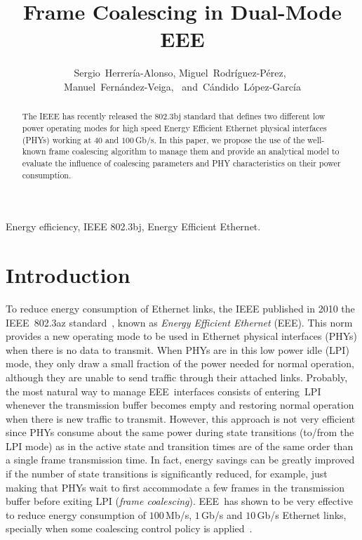 \documentclass[journal,10pt,letterpaper]{IEEEtran}
\begin{document}
\title{Frame Coalescing in Dual-Mode EEE}

\author{Sergio~Herrería-Alonso, 
  Miguel~Rodríguez-Pérez,~ \\
  Manuel~Fernández-Veiga,~ 
  and~Cándido~López-García}



\maketitle

\begin{abstract}
  The IEEE has recently released the 802.3bj standard that defines two
  different low power operating modes for high speed Energy Efficient
  Ethernet physical interfaces (PHYs) working at $40$ and
  $100\,$Gb/s. In this paper, we propose the use of the well-known
  frame coalescing algorithm to manage them and provide an analytical
  model to evaluate the influence of coalescing parameters and PHY
  characteristics on their power consumption.
\end{abstract}

\begin{IEEEkeywords}
  Energy efficiency, IEEE 802.3bj, Energy Efficient Ethernet.
\end{IEEEkeywords}

\section{Introduction}
\label{sec:intro}

To reduce energy consumption of Ethernet links, the IEEE published in
2010 the IEEE~802.3az standard~\cite{802.3az}, known as \emph{Energy
  Efficient Ethernet} (EEE). This norm provides a new operating mode
to be used in Ethernet physical interfaces (PHYs) when there is no
data to transmit. When PHYs are in this low power idle (LPI) mode,
they only draw a small fraction of the power needed for normal
operation, although they are unable to send traffic through their
attached links. Probably, the most natural way to manage
EEE~interfaces consists of entering~LPI whenever the transmission
buffer becomes empty and restoring normal operation when there is new
traffic to transmit. However, this approach is not very efficient
since PHYs consume about the same power during state transitions
(to/from the LPI mode) as in the active state and transition times are
of the same order than a single frame transmission time. In fact,
energy savings can be greatly improved if the number of state
transitions is significantly reduced, for example, just making that
PHYs wait to first accommodate a few frames in the transmission buffer
before exiting LPI (\emph{frame coalescing}). EEE~has shown to be very
effective to reduce energy consumption of $100\,$Mb/s, $1\,$Gb/s and
$10\,$Gb/s Ethernet links, specially when some coalescing control
policy is
applied~\cite{christensen10:_the_road_to_eee,herreria12:gig1}.
\end{document}
